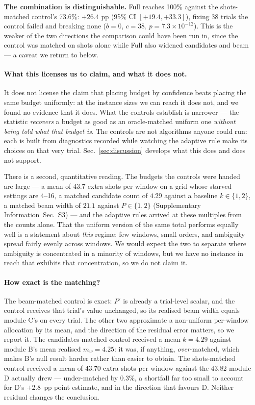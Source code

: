 \documentclass[preprint,11pt]{elsarticle}
\newcommand{\SI}{Supplementary Information}
\newcommand{\SItables}{\SI{}~Sec.~S3}
\begin{document}
\textbf{The combination is distinguishable.} Full reaches 100\% against
the shots-matched control's 73.6\%: $+26.4$ pp (95\% CI $[+19.4,+33.3]$),
fixing 38 trials the control failed and breaking none ($b{=}0$, $c{=}38$,
$p=7.3\times10^{-12}$). This is the weaker of the two directions the
comparison could have been run in, since the control was matched on shots
alone while Full also widened candidates and beam --- a caveat we return
to below.

\paragraph{What this licenses us to claim, and what it does not.} It does
not license the claim that placing budget by confidence beats placing the
same budget uniformly: at the instance sizes we can reach it does not,
and we found no evidence that it does. What the controls establish is
narrower --- the statistic \emph{recovers} a budget as good as an
oracle-matched uniform one \emph{without being told what that budget
is}. The controls are not algorithms anyone could run: each is built from
diagnostics recorded while watching the adaptive rule make its choices on
that very trial. Sec.~\ref{sec:discussion} develops what this does and
does not support.

There is a second, quantitative reading. The budgets the controls were
handed are large --- a mean of $43.7$ extra shots per window on a grid
whose starved settings are 4--16, a matched candidate count of $4.29$
against a baseline $k\in\{1,2\}$, a matched beam width of $21.1$ against
$P\in\{1,2\}$ (\SItables{}) --- and the adaptive rules arrived at these
multiples from the counts alone. That the uniform version of the same
total performs equally well is a statement about \emph{this} regime: few
windows, small orders, and ambiguity spread fairly evenly across windows.
We would expect the two to separate where ambiguity is concentrated in a
minority of windows, but we have no instance in reach that exhibits that
concentration, so we do not claim it.

\paragraph{How exact is the matching?} The beam-matched control is
exact: $P'$ is already a trial-level scalar, and the control receives
that trial's value unchanged, so its realised beam width equals module
C's on every trial. The other two approximate a non-uniform per-window
allocation by its mean, and the direction of the residual error matters,
so we report it. The candidates-matched control received a mean
$k=4.29$ against module B's mean realised $m_w=4.25$: it was, if
anything, \emph{over}-matched, which makes B's null result harder rather
than easier to obtain. The shots-matched control received a mean of
$43.70$ extra shots per window against the $43.82$ module D actually
drew --- under-matched by $0.3\%$, a shortfall far too small to account
for D's $+2.8$~pp point estimate, and in the direction that favours D.
Neither residual changes the conclusion.
\end{document}
